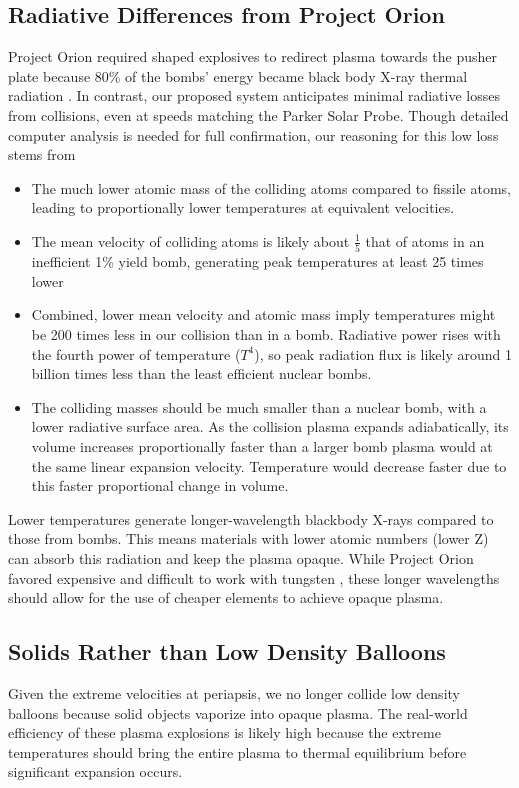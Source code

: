 \documentclass{article}
\begin{document}
{\subsection{Radiative Differences from Project Orion}
Project Orion required shaped explosives to redirect plasma towards the pusher plate because 80\% of the bombs' energy became black body X-ray thermal radiation \cite{toughsf_cassaba_howitzer}.  In contrast, our proposed system anticipates minimal radiative losses from collisions, even at speeds matching the Parker Solar Probe. Though detailed computer analysis is needed for full confirmation, our reasoning for this low loss stems from
\begin{itemize}
    \item The much lower atomic mass of the colliding atoms compared to fissile atoms, leading to proportionally lower temperatures at equivalent velocities.
    \item The mean velocity of colliding atoms is likely about $\frac{1}{5}$ that of atoms in an inefficient 1\% yield bomb, generating peak temperatures at least 25 times lower
    \item Combined, lower mean velocity and atomic mass imply temperatures might be 200 times less in our collision than in a bomb.  Radiative power rises with the fourth power of temperature ($T^4$), so peak radiation flux is likely around 1 billion times less than the least efficient nuclear bombs.
    \item The colliding masses should be much smaller than a nuclear bomb, with a lower radiative surface area.   As the collision plasma expands adiabatically, its volume increases proportionally faster than a larger bomb plasma would at the same linear expansion velocity.  Temperature would decrease faster due to this faster proportional change in volume. 
\end{itemize}

Lower temperatures generate longer-wavelength blackbody X-rays compared to those from bombs. This means materials with lower atomic numbers (lower Z) can absorb this radiation and keep the plasma opaque. While Project Orion favored expensive and difficult to work with tungsten \cite{toughsf_cassaba_howitzer}, these longer wavelengths should allow for the use of cheaper elements to achieve opaque plasma.

\subsection{Solids Rather than Low Density Balloons}\label{sec:solid_balloons}
Given the extreme velocities at periapsis, we no longer collide low density balloons because solid objects vaporize into opaque plasma.   The real-world efficiency of these plasma explosions is likely high because the extreme temperatures should bring the entire plasma to thermal equilibrium before significant expansion occurs.

}
\end{document}
